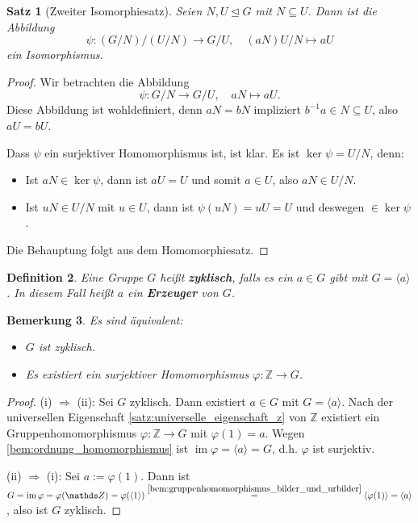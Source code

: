 \documentclass[a4paper, twoside, 11pt, ngerman]{report}
\newcommand{\ZZ}{\mathds Z}
\DeclareMathOperator{\image}{im}
\theoremstyle{definistyle}
\newtheorem{satz}{Satz}[section]
\newtheorem{defini}[satz]{Definition}
\newtheorem{bem}[satz]{Bemerkung}
\theoremstyle{remark}
\newcommand{\defn}[1]{\textit{\bfseries #1}}
\begin{document}
\begin{satz}[Zweiter Isomorphiesatz]\label{satz:zweiter_isomorphiesatz}
Seien $N, U \trianglelefteq G$ mit $N \subseteq U$. Dann ist die Abbildung
\[
\psi \colon (G / N)/(U/N) \to G / U, \quad (aN)U/N \mapsto aU
\]
ein Isomorphismus.
\end{satz}

\begin{proof}
Wir betrachten die Abbildung
\[
\psi \colon G / N \to G / U, \quad aN \mapsto aU.
\]
Diese Abbildung ist wohldefiniert, denn $aN = bN$ impliziert $b^{-1} a \in N \subseteq U$, also $aU = bU$.

Dass $\psi$ ein surjektiver Homomorphismus ist, ist klar. Es ist $\ker \psi = U / N$, denn:
\begin{itemize}
    \item[''$\subseteq$''] Ist $aN \in \ker \psi$, dann ist $aU = U$ und somit $a \in U$, also $aN \in U / N$.
    \item[''$\supseteq$''] Ist $uN \in U / N$ mit $u \in U$, dann ist $\psi(uN) = uU = U$ und deswegen $\in \ker \psi$.
\end{itemize}
Die Behauptung folgt aus dem Homomorphiesatz.
\end{proof}

\begin{defini}\label{def:zyklische_gruppe}
Eine Gruppe $G$ heißt \defn{zyklisch}, falls es ein $a \in G$ gibt mit $G = \langle a \rangle$. In diesem Fall heißt $a$ ein \defn{Erzeuger} von $G$.
\end{defini}

\begin{bem}\label{bem:aequivalenz_zyklisch}
Es sind äquivalent:
\begin{itemize}
    \item[(i)] $G$ ist zyklisch.
    \item[(ii)] Es existiert ein surjektiver Homomorphismus $\varphi \colon \ZZ \to G$.
\end{itemize}
\end{bem}

\begin{proof}
(i) $\Rightarrow$ (ii): Sei $G$ zyklisch. Dann existiert $a \in G$ mit $G = \langle a \rangle$. Nach der universellen Eigenschaft \ref{satz:universelle_eigenschaft_z} von $\ZZ$ existiert ein Gruppenhomomorphismus $\varphi \colon \ZZ \to G$ mit $\varphi(1) = a$. Wegen \ref{bem:ordnung_homomorphismus} ist $\image \varphi = \langle a \rangle = G$, d.h. $\varphi$ ist surjektiv.

(ii) $\Rightarrow$ (i): Sei $a := \varphi(1)$. Dann ist $G = \image \varphi = \varphi(\ZZ)=\varphi(\langle 1\rangle)\overset{\ref{bem:gruppenhomomorphismus_bilder_und_urbilder}}{=}\langle \varphi(1)\rangle=\langle a \rangle$, also ist $G$ zyklisch.
\end{proof}
\end{document}
